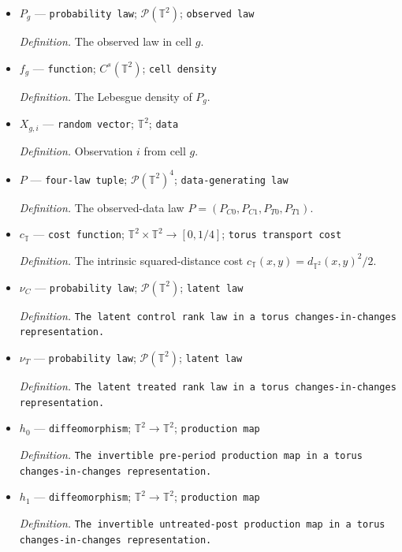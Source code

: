 \documentclass{article}
\begin{document}
\begin{itemize}
  \item \(P_g\) --- \texttt{probability law}; \(\mathcal P(\mathbb T^2)\); \texttt{observed law}
  \par\smallskip\noindent\emph{Definition.} The observed law in cell \(g\).
  \item \(f_g\) --- \texttt{function}; \(C^s(\mathbb T^2)\); \texttt{cell density}
  \par\smallskip\noindent\emph{Definition.} The Lebesgue density of \(P_g\).
  \item \(X_{g,i}\) --- \texttt{random vector}; \(\mathbb T^2\); \texttt{data}
  \par\smallskip\noindent\emph{Definition.} Observation \(i\) from cell \(g\).
  \item \(P\) --- \texttt{four-\allowbreak{}law tuple}; \(\mathcal P(\mathbb T^2)^4\); \texttt{data-\allowbreak{}generating law}
  \par\smallskip\noindent\emph{Definition.} The observed-data law \(P=(P_{C0},P_{C1},P_{T0},P_{T1})\).
  \item \(c_{\mathbb T}\) --- \texttt{cost function}; \(\mathbb T^2\times\mathbb T^2\to[0,1/4]\); \texttt{torus transport cost}
  \par\smallskip\noindent\emph{Definition.} The intrinsic squared-distance cost \(c_{\mathbb T}(x,y)=d_{\mathbb T^2}(x,y)^2/2\).
  \item \(\nu_C\) --- \texttt{probability law}; \(\mathcal P(\mathbb T^2)\); \texttt{latent law}
  \par\smallskip\noindent\emph{Definition.} \texttt{The latent control rank law in a torus changes-\allowbreak{}in-\allowbreak{}changes representation.}
  \item \(\nu_T\) --- \texttt{probability law}; \(\mathcal P(\mathbb T^2)\); \texttt{latent law}
  \par\smallskip\noindent\emph{Definition.} \texttt{The latent treated rank law in a torus changes-\allowbreak{}in-\allowbreak{}changes representation.}
  \item \(h_0\) --- \texttt{diffeomorphism}; \(\mathbb T^2\to\mathbb T^2\); \texttt{production map}
  \par\smallskip\noindent\emph{Definition.} \texttt{The invertible pre-\allowbreak{}period production map in a torus changes-\allowbreak{}in-\allowbreak{}changes representation.}
  \item \(h_1\) --- \texttt{diffeomorphism}; \(\mathbb T^2\to\mathbb T^2\); \texttt{production map}
  \par\smallskip\noindent\emph{Definition.} \texttt{The invertible untreated-\allowbreak{}post production map in a torus changes-\allowbreak{}in-\allowbreak{}changes representation.}

\end{itemize}
\end{document}
